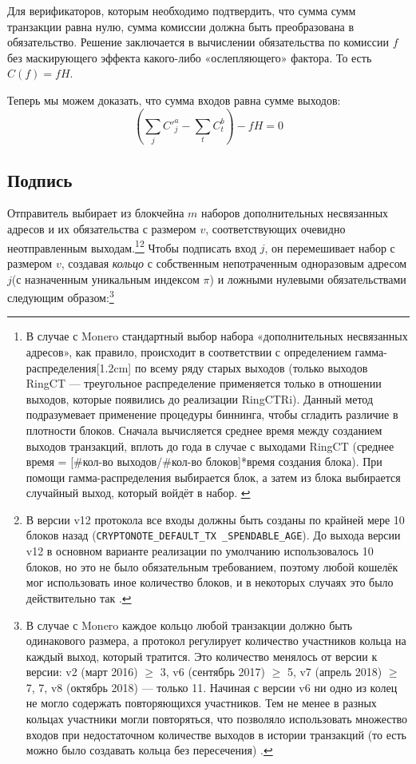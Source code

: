 Для верификаторов, которым необходимо подтвердить, что сумма сумм транзакции равна нулю, сумма комиссии должна быть преобразована в обязательство. Решение заключается в вычислении обязательства по комиссии $f$ без маскирующего эффекта какого-либо «ослепляю\-щего» фактора. То есть $C(f) = f H$.

Теперь мы можем доказать, что сумма входов равна сумме выходов:\\
\[(\sum_j C'^a_{j} - \sum_t C^b_{t}) - f H = 0\]


\subsection{Подпись}
\label{full-signature}

Отправитель выбирает из блокчейна $m$ наборов дополнительных несвязанных адресов и их обязательства с размером $v$, соответствующих очевидно неотправленным выходам.\footnote{\label{input-selection}В случае с Monero стандартный выбор набора «дополнительных несвязанных адресов», как правило, происходит в соответствии с определением гамма-распределения[1.2cm] по всему ряду старых выходов (только выходов RingCT — треугольное распределение применяется только в отношении выходов, которые появились до реализации RingCTRi). Данный метод подразумевает применение процедуры биннинга, чтобы сгладить различие в плотности блоков. Сначала вычисляется среднее время между созданием выходов транзакций, вплоть до года в случае с выходами RingCT (среднее время = [\#кол-во выходов/\#кол-во блоков]*время создания блока). При помощи гамма-распределения выбирается блок, а затем из блока выбирается случайный выход, который войдёт в набор. \cite{AnalysisOfLinkability}}\footnote{В версии v12 протокола все входы должны быть созданы по крайней мере 10 блоков назад ({\tt CRYPTONOTE\_DEFAULT\_TX \_SPENDABLE\_AGE}). До выхода версии v12 в основном варианте реализации по умолчанию использовалось 10 блоков, но это не было обязательным требованием, поэтому любой кошелёк мог использовать иное количество блоков, и в некоторых случаях это было действительно так \cite{visualizing-monero-vid}.} Чтобы подписать вход $j$, он перемешивает набор с размером $v$, создавая {\em кольцо} с собственным непотраченным одноразовым адресом $j$\nth (с назначенным уникальным индексом $\pi$) и ложны\-ми нулевыми обязательствами следующим образом:\footnote{В случае с Monero каждое кольцо любой транзакции должно быть одинакового размера, а протокол регулирует количество участников кольца на каждый выход, который тратится. Это количество менялось от версии к версии: v2 (март 2016) $\geq$ 3, v6 (сентябрь 2017) $\geq$ 5, v7 (апрель 2018) $\geq$ 7, 7, v8 (октябрь 2018) — только 11. Начиная с версии v6 ни одно из колец не могло содержать повторяющихся участников. Тем не менее в разных кольцах участники могли повторяться, что позволяло использовать множество входов при недостаточном количестве выходов в истории транзакций (то есть можно было создавать кольца без пересечения) \cite{duplicate-ring-members}.}
